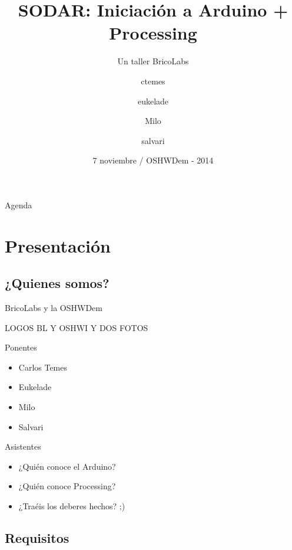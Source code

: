 \documentclass{beamer}
\title[Taller SODAR] %
{SODAR: Iniciación a Arduino + Processing}
\subtitle
{Un taller BricoLabs} %
\author[ctemes, eukelade, milo, salvari] %
{ctemes \and eukelade \and Milo \and salvari}
\institute[BricoLabs] %
{
Asociación BricoLabs 
}
\date[Short Occasion] %
{7 noviembre / OSHWDem - 2014}
\begin{document}
\begin{frame}
  \titlepage
\end{frame}

\begin{frame}{Agenda}
  \tableofcontents
\end{frame}




\section{Presentación}
\subsection{¿Quienes somos?}

\begin{frame}{BricoLabs y la OSHWDem}

LOGOS BL Y OSHWI Y DOS FOTOS   
\end{frame}


\begin{frame}{Ponentes}
  \begin{itemize}
  \item Carlos Temes
  \item Eukelade
  \item Milo
  \item Salvari
  \end{itemize}
\end{frame}

\begin{frame}{Asistentes}
  \begin{itemize}
  \item ¿Quién conoce el Arduino?
    \pause
  \item ¿Quién conoce Processing?
    \pause
  \item ¿Traéis los deberes hechos? ;)
  \end{itemize}
\end{frame}

\subsection{Requisitos}
\end{document}
